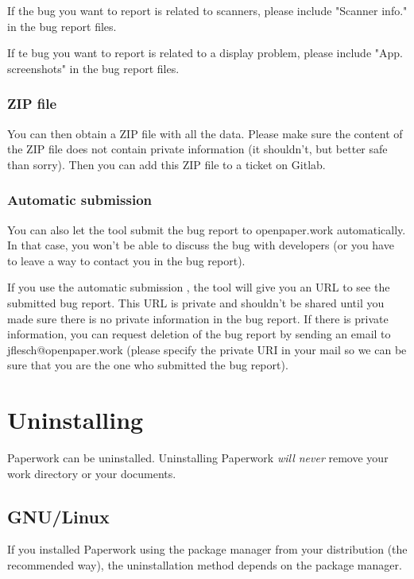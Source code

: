 \documentclass[10pt,a4paper]{article}
\begin{document}
If the bug you want to report is related to scanners, please include
"Scanner info." in the bug report files.

If te bug you want to report is related to a display problem, please include
"App. screenshots" in the bug report files.


\subsubsection{ZIP file}

You can then obtain a ZIP file with all the data. Please make sure the content
of the ZIP file does not contain private information (it shouldn't, but better
safe than sorry). Then you can add this ZIP file to a ticket on Gitlab.


\subsubsection{Automatic submission}

You can also let the tool submit the bug report to openpaper.work
automatically. In that case, you won't be able to discuss the bug with
developers (or you have to leave a way to contact you in the bug report).

If you use the automatic submission , the tool will give you an URL to see the
submitted bug report. This URL is private and shouldn't be shared until you
made sure there is no private information in the bug report. If there is
private information, you can request deletion of the bug report by sending an
email to jflesch@openpaper.work (please specify the private URI in your mail
so we can be sure that you are the one who submitted the bug report).


\section{Uninstalling}

Paperwork can be uninstalled. Uninstalling Paperwork \emph{will never}
remove your work directory or your documents.

\subsection{GNU/Linux}

If you installed Paperwork using the package manager from your distribution
(the recommended way), the uninstallation method depends on the package
manager.
\end{document}
